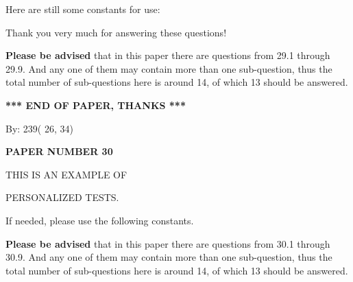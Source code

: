 \documentclass[12pt]{article}
\begin{document}
 
 
   
   
 \vspace{0.2in}
Here are still some constants for use:
 
 
 
 
Thank you very much for answering these questions!
 
{\textbf{\large{Please be advised}}} that in this paper there are questions from
29.1 through
29.9.
And any one of them may contain more than one sub-question, thus the total number
of sub-questions here is around 14, of which
13 should be answered.
 
   
   
   
   
\vspace{1.0in} 
{\textbf{\large{ *** END OF PAPER, THANKS *** }}} 
   
   
\hspace{1.0in} By: 
         239(         26,          34)
   
   
   
   
\newpage 
\setcounter{page}{ 
    30001 } 
   
   
   
   
 {\textbf{ \Large{ PAPER NUMBER          30 }}}
   
   
\vspace{0.2in}
   
   
   
   
   
   
 \vspace{0.2in}
 
 
{\Huge  THIS IS AN EXAMPLE OF}
 
{\Huge  PERSONALIZED TESTS. }
 
If needed, please use the following constants.
 
 
 
{\textbf{\large{Please be advised}}} that in this paper there are questions from
30.1 through
30.9.
And any one of them may contain more than one sub-question, thus the total number
of sub-questions here is around 14, of which
13 should be answered.
 
\vspace{0.3in}
 
 
   
   
  
\vspace{0.2in}
  
\end{document}
